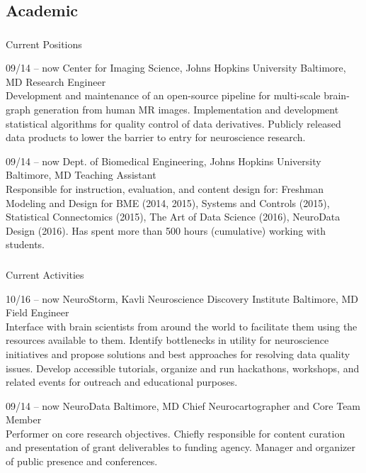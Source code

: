 \documentclass[]{friggeri-cv} %
\begin{document}
\subsection{Academic}

\subsubsection{}{Current Positions}

\begin{entrylist}
\entry
{09/14 -- now}
{Center for Imaging Science, Johns Hopkins University}
{Baltimore, MD}
{Research Engineer\\
Development and maintenance of an open-source pipeline for multi-scale brain-graph generation from human MR images. Implementation and development statistical algorithms for quality control of data derivatives. Publicly released data products to lower the barrier to entry for neuroscience research.}

\entry
{09/14 -- now}
{Dept. of Biomedical Engineering, Johns Hopkins University}
{Baltimore, MD}
{Teaching Assistant \\
Responsible for instruction, evaluation, and content design for: Freshman Modeling and Design for BME (2014, 2015), Systems and Controls (2015), Statistical Connectomics (2015), The Art of Data Science (2016), NeuroData Design (2016). Has spent more than 500 hours (cumulative) working with students.}
\end{entrylist}

\subsubsection{}{Current Activities}

\begin{entrylist}
\entry
{10/16 -- now}
{NeuroStorm, Kavli Neuroscience Discovery Institute}
{Baltimore, MD}
{Field Engineer\\
Interface with brain scientists from around the world to facilitate them using the resources available to them. Identify bottlenecks in utility for neuroscience initiatives and propose solutions and best approaches for resolving data quality issues. Develop accessible tutorials, organize and run hackathons, workshops, and related events for outreach and educational purposes.
}

\entry
{09/14 -- now}
{NeuroData}
{Baltimore, MD}
{Chief Neurocartographer and Core Team Member \\
Performer on core research objectives. Chiefly responsible for content curation and presentation of grant deliverables to funding agency. Manager and organizer of public presence and conferences.}
\end{entrylist}
\end{document}
